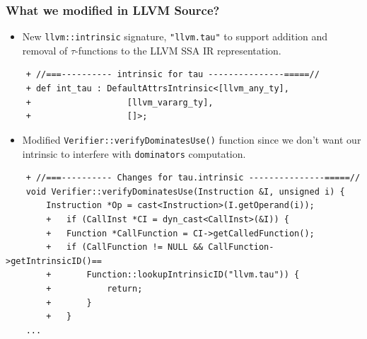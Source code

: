 \documentclass{beamer}
\begin{document}
\footnotesize
\begin{frame}[fragile]
\frametitle{What we modified in LLVM Source?}
\begin{itemize}
	\item New \texttt{llvm::intrinsic} signature, \texttt{"llvm.tau"} to support addition and removal of $\tau$-functions to the LLVM SSA IR representation. 
\end{itemize}
\begin{verbatim}
	+ //===---------- intrinsic for tau ---------------=====//
	+ def int_tau : DefaultAttrsIntrinsic<[llvm_any_ty],
	+                   [llvm_vararg_ty],
	+                   []>;
\end{verbatim}
\begin{itemize}
	\item Modified \texttt{Verifier::verifyDominatesUse()} function since we don't want our intrinsic to interfere with \texttt{dominators} computation.  
\end{itemize}
\begin{verbatim}
	+ //===---------- Changes for tau.intrinsic ---------------=====//
	void Verifier::verifyDominatesUse(Instruction &I, unsigned i) {
		Instruction *Op = cast<Instruction>(I.getOperand(i));
		+	if (CallInst *CI = dyn_cast<CallInst>(&I)) {
		+	Function *CallFunction = CI->getCalledFunction();
		+	if (CallFunction != NULL && CallFunction->getIntrinsicID()==
		+		Function::lookupIntrinsicID("llvm.tau")) {
		+			return;
		+		}
		+	}
	...
	\end{verbatim}
\end{frame}
\end{document}
